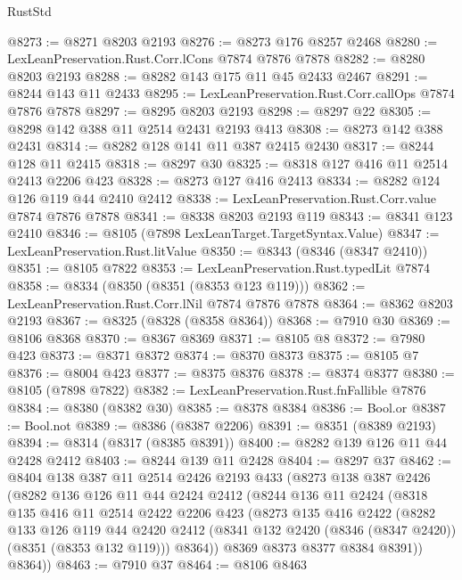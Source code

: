\begin{lexlean}{RustStd}
\begin{coremodule}
@8273 := @8271 @8203 @2193
@8276 := @8273 @176 @8257 @2468
@8280 := LexLeanPreservation.Rust.Corr.lCons @7874 @7876 @7878
@8282 := @8280 @8203 @2193
@8288 := @8282 @143 @175 @11 @45 @2433 @2467
@8291 := @8244 @143 @11 @2433
@8295 := LexLeanPreservation.Rust.Corr.callOps @7874 @7876 @7878
@8297 := @8295 @8203 @2193
@8298 := @8297 @22
@8305 := @8298 @142 @388 @11 @2514 @2431 @2193 @413
@8308 := @8273 @142 @388 @2431
@8314 := @8282 @128 @141 @11 @387 @2415 @2430
@8317 := @8244 @128 @11 @2415
@8318 := @8297 @30
@8325 := @8318 @127 @416 @11 @2514 @2413 @2206 @423
@8328 := @8273 @127 @416 @2413
@8334 := @8282 @124 @126 @119 @44 @2410 @2412
@8338 := LexLeanPreservation.Rust.Corr.value @7874 @7876 @7878
@8341 := @8338 @8203 @2193 @119
@8343 := @8341 @123 @2410
@8346 := @8105 (@7898 LexLeanTarget.TargetSyntax.Value)
@8347 := LexLeanPreservation.Rust.litValue
@8350 := @8343 (@8346 (@8347 @2410))
@8351 := @8105 @7822
@8353 := LexLeanPreservation.Rust.typedLit @7874
@8358 := @8334 (@8350 (@8351 (@8353 @123 @119)))
@8362 := LexLeanPreservation.Rust.Corr.lNil @7874 @7876 @7878
@8364 := @8362 @8203 @2193
@8367 := @8325 (@8328 (@8358 @8364))
@8368 := @7910 @30
@8369 := @8106 @8368
@8370 := @8367 @8369
@8371 := @8105 @8
@8372 := @7980 @423
@8373 := @8371 @8372
@8374 := @8370 @8373
@8375 := @8105 @7
@8376 := @8004 @423
@8377 := @8375 @8376
@8378 := @8374 @8377
@8380 := @8105 (@7898 @7822)
@8382 := LexLeanPreservation.Rust.fnFallible @7876
@8384 := @8380 (@8382 @30)
@8385 := @8378 @8384
@8386 := Bool.or
@8387 := Bool.not
@8389 := @8386 (@8387 @2206)
@8391 := @8351 (@8389 @2193)
@8394 := @8314 (@8317 (@8385 @8391))
@8400 := @8282 @139 @126 @11 @44 @2428 @2412
@8403 := @8244 @139 @11 @2428
@8404 := @8297 @37
@8462 := @8404
    @138
    @387
    @11
    @2514
    @2426
    @2193
    @433
    (@8273
      @138
      @387
      @2426
      (@8282
        @136
        @126
        @11
        @44
        @2424
        @2412
        (@8244
          @136
          @11
          @2424
          (@8318
            @135
            @416
            @11
            @2514
            @2422
            @2206
            @423
            (@8273
              @135
              @416
              @2422
              (@8282
                @133
                @126
                @119
                @44
                @2420
                @2412
                (@8341 @132 @2420 (@8346 (@8347 @2420)) (@8351 (@8353 @132 @119)))
                @8364))
            @8369
            @8373
            @8377
            @8384
            @8391))
        @8364))
@8463 := @7910 @37
@8464 := @8106 @8463

\end{coremodule}
\end{lexlean}
